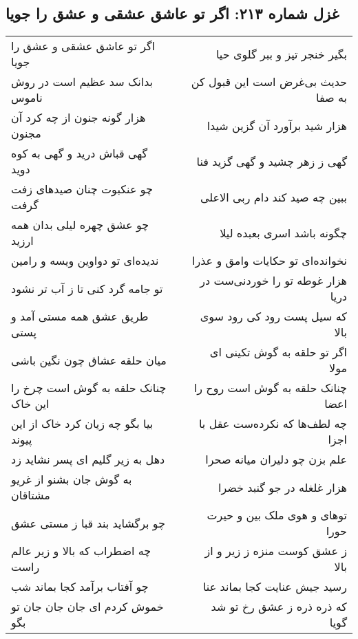 \begin{center}
\section*{غزل شماره ۲۱۳: اگر تو عاشق عشقی و عشق را جویا}
\label{sec:0213}
\begin{longtable}{l p{0.5cm} r}
اگر تو عاشق عشقی و عشق را جویا
&&
بگیر خنجر تیز و ببر گلوی حیا
\\
بدانک سد عظیم است در روش ناموس
&&
حدیث بی‌غرض است این قبول کن به صفا
\\
هزار گونه جنون از چه کرد آن مجنون
&&
هزار شید برآورد آن گزین شیدا
\\
گهی قباش درید و گهی به کوه دوید
&&
گهی ز زهر چشید و گهی گزید فنا
\\
چو عنکبوت چنان صیدهای زفت گرفت
&&
ببین چه صید کند دام ربی الاعلی
\\
چو عشق چهره لیلی بدان همه ارزید
&&
چگونه باشد اسری بعبده لیلا
\\
ندیده‌ای تو دواوین ویسه و رامین
&&
نخوانده‌ای تو حکایات وامق و عذرا
\\
تو جامه گرد کنی تا ز آب تر نشود
&&
هزار غوطه تو را خوردنی‌ست در دریا
\\
طریق عشق همه مستی آمد و پستی
&&
که سیل پست رود کی رود سوی بالا
\\
میان حلقه عشاق چون نگین باشی
&&
اگر تو حلقه به گوش تکینی ای مولا
\\
چنانک حلقه به گوش است چرخ را این خاک
&&
چنانک حلقه به گوش است روح را اعضا
\\
بیا بگو چه زیان کرد خاک از این پیوند
&&
چه لطف‌ها که نکرده‌ست عقل با اجزا
\\
دهل به زیر گلیم ای پسر نشاید زد
&&
علم بزن چو دلیران میانه صحرا
\\
به گوش جان بشنو از غریو مشتاقان
&&
هزار غلغله در جو گنبد خضرا
\\
چو برگشاید بند قبا ز مستی عشق
&&
توهای و هوی ملک بین و حیرت حورا
\\
چه اضطراب که بالا و زیر عالم راست
&&
ز عشق کوست منزه ز زیر و از بالا
\\
چو آفتاب برآمد کجا بماند شب
&&
رسید جیش عنایت کجا بماند عنا
\\
خموش کردم ای جان جان جان تو بگو
&&
که ذره ذره ز عشق رخ تو شد گویا
\\
\end{longtable}
\end{center}
